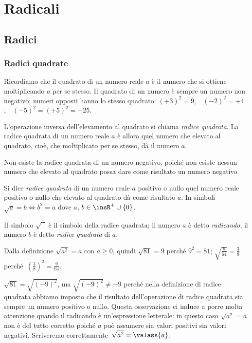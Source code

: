 \chapter{Radicali}
\section{Radici}
\subsection{Radici quadrate}
Ricordiamo che il quadrato di un numero reale $a$ è il numero che si ottiene moltiplicando $a$ per se stesso. Il quadrato di un numero è sempre un numero non negativo; numeri opposti hanno lo stesso quadrato: $(+3)^2=9$,~~$(-2)^2=+4$,~~$(-5)^2=(+5)^2=+25$.

L'operazione inversa dell'elevamento al quadrato si chiama \emph{radice quadrata}. La radice quadrata di un numero reale $a$ è allora quel numero che elevato al quadrato, cioè, che moltiplicato per se stesso, dà il numero $a$.

\osservazione Non esiste la radice quadrata di un numero negativo, poiché non esiste nessun numero che elevato al quadrato possa dare come risultato un numero negativo.

\begin{definizione}
Si dice \emph{radice quadrata} di un numero reale $a$ positivo o nullo quel numero reale positivo o nullo che elevato al quadrato dà come risultato $a$.
In simboli~$\sqrt{a}=b \Leftrightarrow b^2=a$ dove $a$, $b\in \insR^{+}\cup \{0\}$.
\end{definizione}

Il simbolo $\sqrt{\phantom{5}}$ è il simbolo della radice quadrata; il numero $a$ è detto \emph{radicando}, il numero $b$ è detto \emph{radice quadrata} di $a$.

Dalla definizione $\sqrt{a^2}=a$ con $a\ge 0$, quindi $\sqrt{81}=9$ perché $9^2=81$; $\sqrt{\frac{9}{64}}=\frac{3}{8}$ perché~$\left(\frac{3}{8}\right)^2=\frac{9}{64}$.

\osservazione $\sqrt{81}=\sqrt{(-9)^2}$, ma $\sqrt{(-9)^2}\neq-9$ perché nella definizione di radice quadrata abbiamo imposto che il risultato dell'operazione di radice quadrata sia sempre un numero positivo o nullo.
Questa osservazione ci induce a porre molta attenzione quando il radicando è un'espressione letterale: in questo caso $\sqrt{a^2}=a$ non è del tutto corretto poiché $a$ può assumere sia valori positivi sia valori negativi. Scriveremo correttamente~$\sqrt{a^2}=\valass{a}$.

